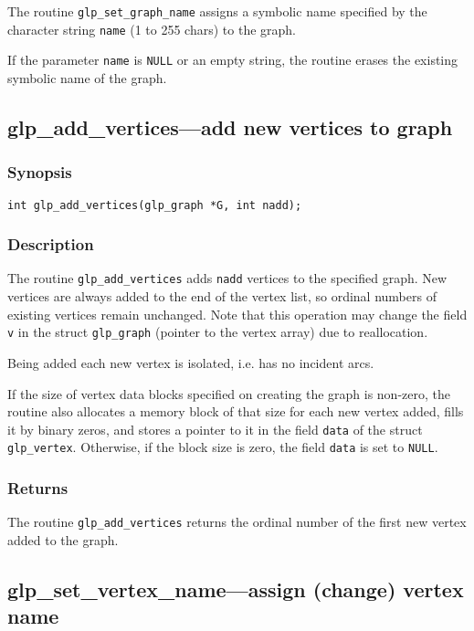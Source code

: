 The routine \verb|glp_set_graph_name| assigns a symbolic name specified
by the character string \verb|name| (1 to 255 chars) to the graph.

If the parameter \verb|name| is \verb|NULL| or an empty string, the
routine erases the existing symbolic name of the graph.

\newpage

\subsection{glp\_add\_vertices---add new vertices to graph}

\subsubsection*{Synopsis}

\begin{verbatim}
int glp_add_vertices(glp_graph *G, int nadd);
\end{verbatim}

\subsubsection*{Description}

The routine \verb|glp_add_vertices| adds \verb|nadd| vertices to the
specified graph. New vertices are always added to the end of the vertex
list, so ordinal numbers of existing vertices remain unchanged. Note
that this operation may change the field \verb|v| in the struct
\verb|glp_graph| (pointer to the vertex array) due to reallocation.

Being added each new vertex is isolated, i.e. has no incident arcs.

If the size of vertex data blocks specified on creating the graph is
non-zero, the routine also allocates a memory block of that size for
each new vertex added, fills it by binary zeros, and stores a pointer to
it in the field \verb|data| of the struct \verb|glp_vertex|. Otherwise,
if the block size is zero, the field \verb|data| is set to \verb|NULL|.

\subsubsection*{Returns}

The routine \verb|glp_add_vertices| returns the ordinal number of the
first new vertex added to the graph.

\subsection{glp\_set\_vertex\_name---assign (change) vertex name}

